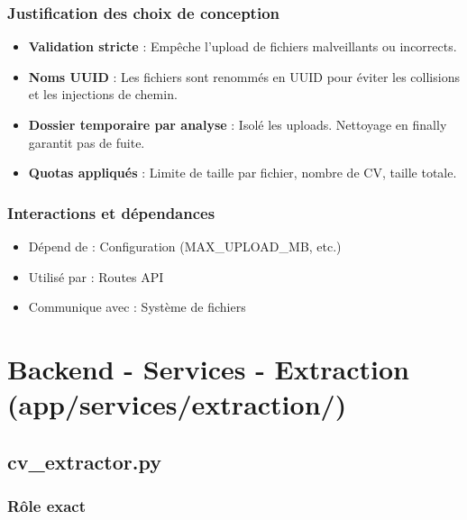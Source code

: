 \documentclass[12pt,a4paper,oneside]{book}
\begin{document}
\subsubsection{Justification des choix de conception}

\begin{itemize}
    \item \textbf{Validation stricte} : Empêche l'upload de fichiers malveillants ou incorrects.
    
    \item \textbf{Noms UUID} : Les fichiers sont renommés en UUID pour éviter les collisions et les injections de chemin.
    
    \item \textbf{Dossier temporaire par analyse} : Isolé les uploads. Nettoyage en finally garantit pas de fuite.
    
    \item \textbf{Quotas appliqués} : Limite de taille par fichier, nombre de CV, taille totale.
\end{itemize}

\subsubsection{Interactions et dépendances}

\begin{itemize}
    \item Dépend de : Configuration (MAX\_UPLOAD\_MB, etc.)
    \item Utilisé par : Routes API
    \item Communique avec : Système de fichiers
\end{itemize}

\newpage


\section{Backend - Services - Extraction (app/services/extraction/)}

\subsection{cv\_extractor.py}

\subsubsection{Rôle exact}
\end{document}
